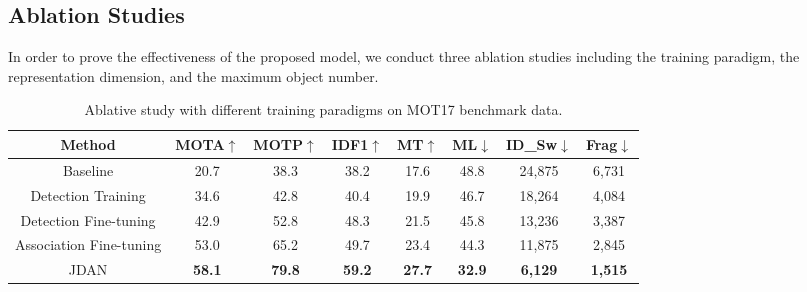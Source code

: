 \documentclass[acmsmall]{acmart}
\begin{document}




\subsection{Ablation {Studies}}
{
In order to prove the effectiveness of the proposed model, we conduct three ablation studies including the training paradigm, the representation dimension, and the maximum object number.
}


\begin{table}
	\begin{center}
		\caption{
		Ablative study with different training paradigms on MOT17 benchmark data. 
}
		\label{table:training_methods}
		\centering
		\setlength{\tabcolsep}{3.5pt}
		\begin{tabular}{c|c|c|c|c|c|c|c}
			\hline
			\hline
			Method & MOTA$\uparrow$ & MOTP$\uparrow$ & IDF1$\uparrow$ & MT$\uparrow$ & ML$\downarrow$ &  ID\_Sw$\downarrow$ & Frag$\downarrow$\\
			\hline
			{Baseline} & 20.7 & 38.3 & 38.2 & 17.6 & 48.8 & 24,875 & 6,731\\
			{Detection Training} & 34.6 & 42.8 & 40.4 & 19.9 & 46.7 & 18,264 & 4,084\\
			{Detection Fine-tuning} & {42.9} & {52.8} & {48.3} & {21.5} & {45.8} & {13,236} & {3,387}\\
			{Association Fine-tuning} & {53.0} & {65.2} & {49.7} & {23.4} & {44.3} & {11,875} & {2,845}\\
			JDAN & {\bf58.1} & {\bf79.8} & {\bf59.2} & {\bf27.7} & {\bf32.9} & {\bf6,129} & {\bf1,515}\\
			\hline
			\hline
		\end{tabular}
	\end{center}
\end{table}

\end{document}
